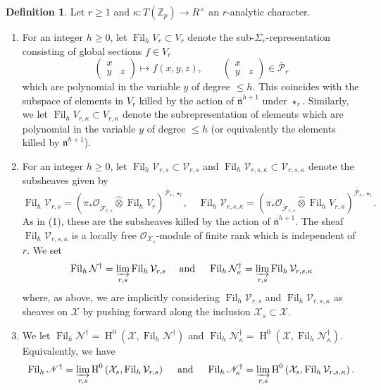 \documentclass[10pt, oneside]{amsart}
\renewcommand{\tilde}{\widetilde}
\numberwithin{equation}{subsection}
\theoremstyle{definition}
\newtheorem{definition}[equation]{Definition}
\theoremstyle{remark}
\newcommand{\mbb}[1]{\mathbb{#1}}
\newcommand{\hatot}{\hat{\otimes}}
\newcommand{\opn}[1]{\operatorname{#1}}
\newcommand{\tbyt}[4]{\left( \begin{matrix} #1 & #2 \\ #3 & #4 \end{matrix} \right)}
\begin{document}
\begin{definition}
    Let $r \geq 1$ and $\kappa \colon T(\mbb{Z}_p) \to R^{\times}$ an $r$-analytic character.
    \begin{enumerate}
        \item For an integer $h \geq 0$, let $\opn{Fil}_h V_r \subset V_r$ denote the sub-$\Sigma_r$-representation consisting of global sections $f \in V_r$
        \[
        \tbyt{x}{}{y}{z} \mapsto f(x, y, z), \quad \quad \tbyt{x}{}{y}{z} \in \overline{\mathcal{P}}_r
        \]
        which are polynomial in the variable $y$ of degree $\leq h$. This coincides with the subspace of elements in $V_r$ killed by the action of $\overline{\mathfrak{n}}^{h+1}$ under $\star_r$. Similarly, we let $\opn{Fil}_h V_{r, \kappa} \subset V_{r, \kappa}$ denote the subrepresentation of elements which are polynomial in the variable $y$ of degree $\leq h$ (or equivalently the elements killed by $\overline{\mathfrak{n}}^{h+1}$).
        \item For an integer $h \geq 0$, let $\opn{Fil}_h\mathcal{V}_{r, s} \subset \mathcal{V}_{r, s}$ and $\opn{Fil}_h\mathcal{V}_{r, s, \kappa} \subset \mathcal{V}_{r, s, \kappa}$ denote the subsheaves given by
        \[
        \opn{Fil}_h\mathcal{V}_{r, s} = \left( \pi_* \mathcal{O}_{\tilde{\mathcal{F}}_{r, s}} \hatot \opn{Fil}_h V_{r} \right)^{\overline{\mathcal{P}}_r, \star_l}, \quad \opn{Fil}_h\mathcal{V}_{r, s, \kappa} = \left( \pi_* \mathcal{O}_{\tilde{\mathcal{F}}_{r, s}} \hatot \opn{Fil}_h V_{r, \kappa} \right)^{\overline{\mathcal{P}}_r, \star_l} .
        \]
        As in (1), these are the subsheaves killed by the action of $\overline{\mathfrak{n}}^{h+1}$. The sheaf $\opn{Fil}_h\mathcal{V}_{r, s, \kappa}$ is a locally free $\mathcal{O}_{\mathcal{X}_s}$-module of finite rank which is independent of $r$. We set
        \[
        \opn{Fil}_h \mathcal{N}^{\dagger} =\varinjlim_{r, s} \opn{Fil}_h\mathcal{V}_{r, s} \quad \text{ and } \quad \opn{Fil}_h \mathcal{N}_{\kappa}^{\dagger} =\varinjlim_{r, s} \opn{Fil}_h\mathcal{V}_{r, s, \kappa}
        \]
        where, as above, we are implicitly considering $\opn{Fil}_h\mathcal{V}_{r, s}$ and $\opn{Fil}_h\mathcal{V}_{r, s, \kappa}$ as sheaves on $\mathcal{X}$ by pushing forward along the inclusion $\mathcal{X}_s \subset \mathcal{X}$.
        \item We let $\opn{Fil}_h\mathscr{N}^{\dagger} = \opn{H}^0\left(\mathcal{X}, \opn{Fil}_h\mathcal{N}^{\dagger} \right)$ and $\opn{Fil}_h\mathscr{N}^{\dagger}_{\kappa} = \opn{H}^0\left(\mathcal{X}, \opn{Fil}_h\mathcal{N}_{\kappa}^{\dagger} \right)$. Equivalently, we have
        \[
        \opn{Fil}_h\mathscr{N}^{\dagger} = \varinjlim_{r, s}\opn{H}^0\left(\mathcal{X}_s, \opn{Fil}_h\mathcal{V}_{r, s} \right) \quad \text{ and } \quad \opn{Fil}_h\mathscr{N}_{\kappa}^{\dagger} = \varinjlim_{r, s}\opn{H}^0\left(\mathcal{X}_s, \opn{Fil}_h\mathcal{V}_{r, s, \kappa} \right) . 
        \]
    \end{enumerate}
\end{definition}
\end{document}
